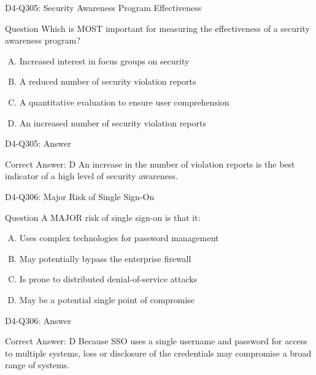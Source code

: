 \documentclass{beamer}
\begin{document}
	\begin{frame}{D4-Q305: Security Awareness Program Effectiveness}
		\begin{block}{Question}
			Which is MOST important for measuring the effectiveness of a security awareness program?
		\end{block}
		\begin{enumerate}[(A)]
			\item Increased interest in focus groups on security
			\item A reduced number of security violation reports
			\item A quantitative evaluation to ensure user comprehension
			\item An increased number of security violation reports
		\end{enumerate}
	\end{frame}
	\begin{frame}{D4-Q305: Answer}
		\begin{block}{Correct Answer: D}
			An increase in the number of violation reports is the best indicator of a high level of security awareness.
		\end{block}
	\end{frame}
	
	\begin{frame}{D4-Q306: Major Risk of Single Sign-On}
		\begin{block}{Question}
			A MAJOR risk of single sign-on is that it:
		\end{block}
		\begin{enumerate}[(A)]
			\item Uses complex technologies for password management
			\item May potentially bypass the enterprise firewall
			\item Is prone to distributed denial-of-service attacks
			\item May be a potential single point of compromise
		\end{enumerate}
	\end{frame}
	\begin{frame}{D4-Q306: Answer}
		\begin{block}{Correct Answer: D}
			Because SSO uses a single username and password for access to multiple systems, loss or disclosure of the credentials may compromise a broad range of systems.
		\end{block}
	\end{frame}
	
\end{document}
